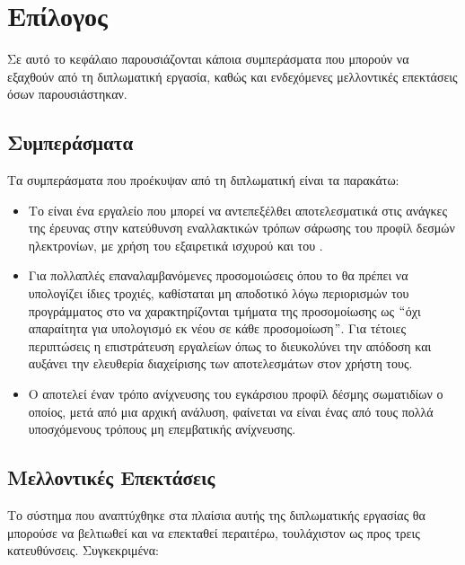 \chapter{Επίλογος}
Σε αυτό το κεφάλαιο παρουσιάζονται κάποια συμπεράσματα που μπορούν να εξαχθούν από τη διπλωματική εργασία, καθώς και ενδεχόμενες μελλοντικές επεκτάσεις όσων παρουσιάστηκαν.

\section{Συμπεράσματα}
Τα συμπεράσματα που προέκυψαν από τη διπλωματική είναι τα παρακάτω:
\begin{itemize}
\item Το  είναι ένα εργαλείο που μπορεί να αντεπεξέλθει αποτελεσματικά στις ανάγκες της έρευνας στην κατεύθυνση εναλλακτικών τρόπων σάρωσης του προφίλ δεσμών ηλεκτρονίων, με χρήση του εξαιρετικά ισχυρού  και του .
\item Για πολλαπλές επαναλαμβανόμενες προσομοιώσεις όπου το  θα πρέπει να υπολογίζει ίδιες τροχιές, καθίσταται μη αποδοτικό λόγω περιορισμών του προγράμματος στο να χαρακτηρίζονται τμήματα της προσομοίωσης ως $``$όχι απαραίτητα για υπολογισμό εκ νέου σε κάθε προσομοίωση$"$. 
Για τέτοιες περιπτώσεις η επιστράτευση εργαλείων όπως το  διευκολύνει την απόδοση και αυξάνει την ελευθερία διαχείρισης των αποτελεσμάτων στον χρήστη τους.
\item Ο  αποτελεί έναν τρόπο ανίχνευσης του εγκάρσιου προφίλ δέσμης σωματιδίων ο οποίος, μετά από μια αρχική ανάλυση, φαίνεται να είναι ένας από τους πολλά υποσχόμενους τρόπους μη επεμβατικής ανίχνευσης.
\end{itemize}

\section{Μελλοντικές Επεκτάσεις}
Το σύστημα που αναπτύχθηκε στα πλαίσια αυτής της διπλωματικής εργασίας θα μπορούσε να βελτιωθεί και να επεκταθεί περαιτέρω,
τουλάχιστον ως προς τρεις κατευθύνσεις. 
Συγκεκριμένα:

